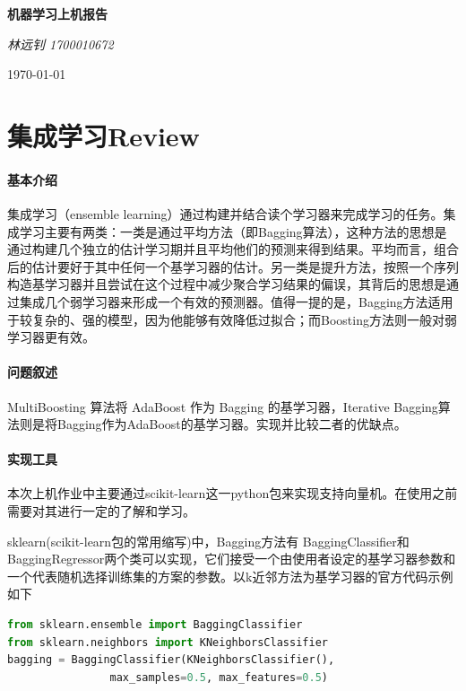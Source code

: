 \documentclass[UTF8]{ctexart}
\begin{document}
	\begin{titlepage}
		\vspace*{\fill}
		\begin{center}
			\normalfont
			{\Huge \bfseries 机器学习上机报告}
			
			\bigskip
			
			{\Large \itshape 林远钊 1700010672}
			
			\medskip
			
			\today
		\end{center}
	\end{titlepage}
	\newpage
	\tableofcontents
	
	\newpage
\section{集成学习Review}
\paragraph{基本介绍}集成学习（ensemble learning）通过构建并结合读个学习器来完成学习的任务。集成学习主要有两类：一类是通过平均方法（即Bagging算法），这种方法的思想是通过构建几个独立的估计学习期并且平均他们的预测来得到结果。平均而言，组合后的估计要好于其中任何一个基学习器的估计。另一类是提升方法，按照一个序列构造基学习器并且尝试在这个过程中减少聚合学习结果的偏误，其背后的思想是通过集成几个弱学习器来形成一个有效的预测器。值得一提的是，Bagging方法适用于较复杂的、强的模型，因为他能够有效降低过拟合；而Boosting方法则一般对弱学习器更有效。

\paragraph{问题叙述}MultiBoosting 算法将 AdaBoost 作为 Bagging 的基学习器，Iterative Bagging算法则是将Bagging作为AdaBoost的基学习器。实现并比较二者的优缺点。

\paragraph{实现工具}本次上机作业中主要通过scikit-learn这一python包来实现支持向量机。在使用之前需要对其进行一定的了解和学习。

sklearn(scikit-learn包的常用缩写)中，Bagging方法有 BaggingClassifier和BaggingRegressor两个类可以实现，它们接受一个由使用者设定的基学习器参数和一个代表随机选择训练集的方案的参数。以k近邻方法为基学习器的官方代码示例如下
\begin{lstlisting}[language= python]
from sklearn.ensemble import BaggingClassifier
from sklearn.neighbors import KNeighborsClassifier
bagging = BaggingClassifier(KNeighborsClassifier(),
				max_samples=0.5, max_features=0.5)
\end{lstlisting}
\end{document}
